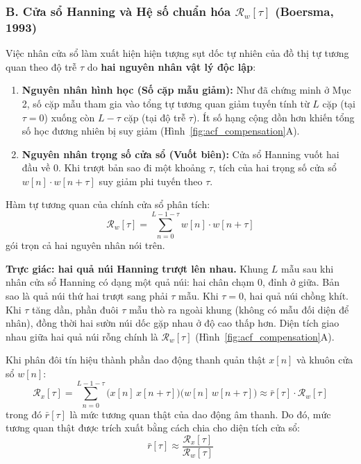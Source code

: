 \documentclass[11pt,a4paper]{article}
\begin{document}
\subsubsection*{B. Cửa sổ Hanning và Hệ số chuẩn hóa $\mathcal{R}_w[\tau]$ (Boersma, 1993)}

Việc nhân cửa sổ làm xuất hiện hiện tượng sụt dốc tự nhiên của đồ thị tự tương quan theo độ trễ $\tau$ do \textbf{hai nguyên nhân vật lý độc lập}:
\begin{enumerate}
    \setlength{\itemsep}{0.5pt}
    \item \textbf{Nguyên nhân hình học (Số cặp mẫu giảm):} Như đã chứng minh ở Mục 2, số cặp mẫu tham gia vào tổng tự tương quan giảm tuyến tính từ $L$ cặp (tại $\tau = 0$) xuống còn $L - \tau$ cặp (tại độ trễ $\tau$). Ít số hạng cộng dồn hơn khiến tổng số học đương nhiên bị suy giảm (Hình~\ref{fig:acf_compensation}A).
    \item \textbf{Nguyên nhân trọng số cửa sổ (Vuốt biên):} Cửa sổ Hanning vuốt hai đầu về 0. Khi trượt bản sao đi một khoảng $\tau$, tích của hai trọng số cửa sổ $w[n] \cdot w[n+\tau]$ suy giảm phi tuyến theo $\tau$.
\end{enumerate}

Hàm tự tương quan của chính cửa sổ phân tích:
\begin{equation}
\mathcal{R}_w[\tau] = \sum_{n=0}^{L - 1 - \tau} w[n] \cdot w[n+\tau]
\end{equation}
gói trọn cả hai nguyên nhân nói trên.

\textbf{Trực giác: hai quả núi Hanning trượt lên nhau.}
Khung $L$ mẫu sau khi nhân cửa sổ Hanning có dạng một quả núi: hai chân chạm $0$, đỉnh ở giữa. Bản sao là quả núi thứ hai trượt sang phải $\tau$ mẫu. Khi $\tau = 0$, hai quả núi chồng khít. Khi $\tau$ tăng dần, phần đuôi $\tau$ mẫu thò ra ngoài khung (không có mẫu đối diện để nhân), đồng thời hai sườn núi dốc gặp nhau ở độ cao thấp hơn. Diện tích giao nhau giữa hai quả núi rỗng chính là $\mathcal{R}_w[\tau]$ (Hình~\ref{fig:acf_compensation}A).

Khi phân đôi tín hiệu thành phần dao động thanh quản thật $x[n]$ và khuôn cửa sổ $w[n]$:
\begin{equation}
\mathcal{R}_x[\tau] = \sum_{n=0}^{L-1-\tau} \big(x[n]\,x[n+\tau]\big)\big(w[n]\,w[n+\tau]\big) \approx \bar{r}[\tau] \cdot \mathcal{R}_w[\tau]
\label{eq:rx_approx_bar_r}
\end{equation}
trong đó $\bar{r}[\tau]$ là mức tương quan thật của dao động âm thanh. Do đó, mức tương quan thật được trích xuất bằng cách chia cho diện tích cửa sổ:
\begin{equation}
\bar{r}[\tau] \approx \frac{\mathcal{R}_x[\tau]}{\mathcal{R}_w[\tau]}
\end{equation}
\end{document}
